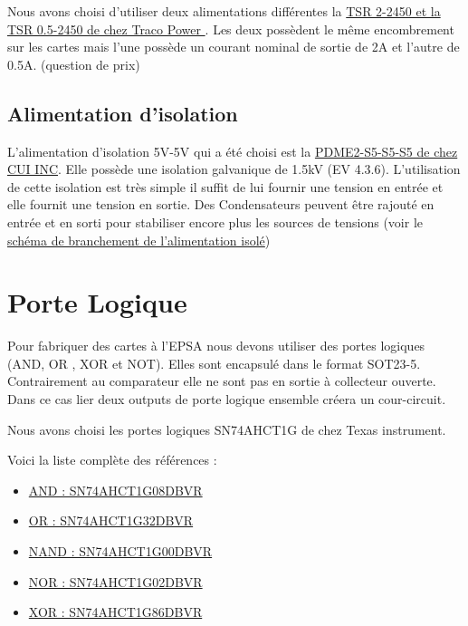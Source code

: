 \documentclass{EPSA-rap-template}
\begin{document}
Nous avons choisi d'utiliser deux alimentations différentes la \hyperlink{Alim}{ TSR 2-2450 et la TSR 0.5-2450  de chez Traco Power }. Les deux possèdent le même encombrement sur les cartes mais l'une possède un courant nominal de sortie de 2A et l'autre de 0.5A. (question de prix)



\subsection{Alimentation d'isolation}

L'alimentation d'isolation 5V-5V qui a été choisi est la \hyperlink{AlimIsol}{PDME2-S5-S5-S5 de chez CUI INC}. Elle possède une isolation galvanique de 1.5kV (EV 4.3.6). L'utilisation de cette isolation est très simple il suffit de lui fournir une tension en entrée et elle fournit une tension en sortie. Des Condensateurs peuvent être rajouté en entrée et en sorti pour stabiliser encore plus les sources de tensions (voir le \hyperlink{IsolAlim}{schéma de branchement de l'alimentation isolé})


\section{ Porte Logique }

Pour fabriquer des cartes à l'EPSA nous devons utiliser des portes logiques (AND, OR , XOR et NOT). Elles sont encapsulé dans le format SOT23-5. Contrairement au comparateur elle ne sont pas en sortie à collecteur ouverte. Dans ce cas lier deux outputs de porte logique ensemble créera un cour-circuit.

Nous avons choisi les portes logiques SN74AHCT1G de chez Texas instrument.

Voici la liste complète des références : 
\begin{itemize}
\item \hyperlink{And}{AND : SN74AHCT1G08DBVR}
\item \hyperlink{Or}{OR : SN74AHCT1G32DBVR}
\item \hyperlink{NAnd}{NAND : SN74AHCT1G00DBVR}
\item \hyperlink{NOr}{NOR : SN74AHCT1G02DBVR}
\item \hyperlink{XOr}{XOR : SN74AHCT1G86DBVR}
\end{itemize}
\end{document}

